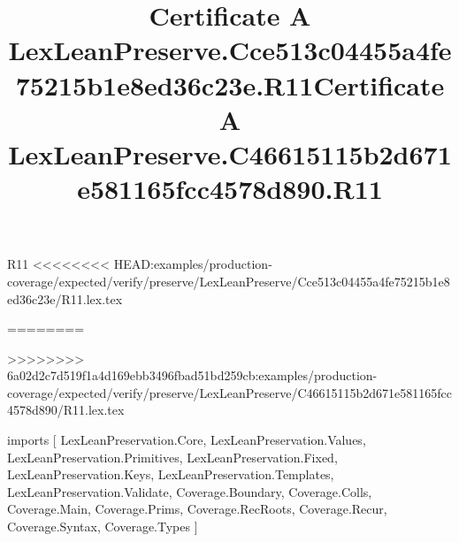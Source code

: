 \begin{lexlean}{R11}
<<<<<<<< HEAD:examples/production-coverage/expected/verify/preserve/LexLeanPreserve/Cce513c04455a4fe75215b1e8ed36c23e/R11.lex.tex
\title{Certificate A LexLeanPreserve.Cce513c04455a4fe75215b1e8ed36c23e.R11}
========
\title{Certificate A LexLeanPreserve.C46615115b2d671e581165fcc4578d890.R11}
>>>>>>>> 6a02d2c7d519f1a4d169ebb3496fbad51bd259cb:examples/production-coverage/expected/verify/preserve/LexLeanPreserve/C46615115b2d671e581165fcc4578d890/R11.lex.tex
\begin{coremodule}
imports [
  LexLeanPreservation.Core,
  LexLeanPreservation.Values,
  LexLeanPreservation.Primitives,
  LexLeanPreservation.Fixed,
  LexLeanPreservation.Keys,
  LexLeanPreservation.Templates,
  LexLeanPreservation.Validate,
  Coverage.Boundary,
  Coverage.Colls,
  Coverage.Main,
  Coverage.Prims,
  Coverage.RecRoots,
  Coverage.Recur,
  Coverage.Syntax,
  Coverage.Types
]


\end{coremodule}
\end{lexlean}
